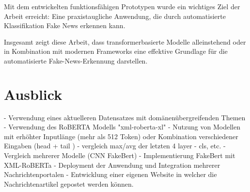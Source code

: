 Mit dem entwickelten funktionsfähigen Prototypen wurde ein wichtiges Ziel der Arbeit erreicht: 
Eine praxistaugliche Anwendung, die durch automatisierte Klassifikation Fake News erkennen kann.

Insgesamt zeigt diese Arbeit, dass transformerbasierte Modelle alleinstehend oder in Kombination mit modernen Frameworks eine effektive Grundlage 
für die automatisierte Fake-News-Erkennung darstellen.

\chapter{Ausblick}
\label{chap:ausblick}

- Verwendung eines aktuelleren Datensatzes mit domänenübergreifenden Themen
- Verwendung des RoBERTA Modells "xml-roberta-xl"
- Nutzung von Modellen mit erhöhter Inputlänge (mehr als 512 Token) oder Kombination verschiedener Eingaben (head + tail \cite{sun2020finetuneberttextclassification})
- vergleich max/avg der letzten 4 layer - cls, etc. 
- Vergleich mehrerer Modelle (CNN FakeBert)
- Implementierung FakeBert mit XML-RoBERTa
- Deployment der Anwendung und Integration mehrerer Nachrichtenportalen
- Entwicklung einer eigenen Website in welcher die Nachrichtenartikel gepostet werden können.
